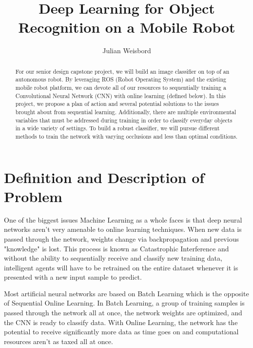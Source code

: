\documentclass[a4paper, 10pt]{article}
\title{Deep Learning for Object Recognition on a Mobile Robot}
\author{Julian Weisbord}
\begin{document}
\maketitle

\begin{abstract}
For our senior design capstone project, we will build an image classifier on top of an autonomous robot. By leveraging ROS (Robot Operating System) and the existing mobile robot platform, we can devote all of our resources to sequentially training a Convolutional Neural Network (CNN) with online learning (defined below). In this project, we propose a plan of action and several potential solutions to the issues brought about from sequential learning. Additionally, there are multiple environmental variables that must be addressed during training in order to classify everyday objects in a wide variety of settings. To build a robust classifier, we will pursue different methods to train the network with varying occlusions and less than optimal conditions.
\end{abstract}

\newpage

\section{Definition and Description of Problem}

One of the biggest issues Machine Learning as a whole faces is that deep neural networks aren't very amenable to online learning techniques. When new data is passed through the network, weights change via backpropagation and previous "knowledge" is lost. This process is known as Catastrophic Interference and without the ability to sequentially receive and classify new training data, intelligent agents will have to be retrained on the entire dataset whenever it is presented with a new input sample to predict.

Most artificial neural networks are based on Batch Learning which is the opposite of Sequential Online Learning. In Batch Learning, a group of training samples is passed through the network all at once, the network weights are optimized, and the CNN is ready to classify data. With Online Learning, the network has the potential to receive significantly more data as time goes on and computational resources aren't as taxed all at once.
\end{document}
